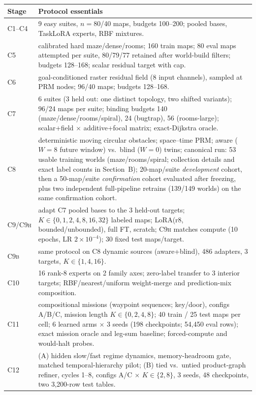 \documentclass[letterpaper]{article} %
\newcommand{\stage}[1]{\textsc{#1}}
\begin{document}
\begin{table}[t]
\centering
\small
\begin{tabular}{@{}lp{14.2cm}@{}}
\toprule
Stage & Protocol essentials \\
\midrule
\stage{C1--C4} & 9 easy suites, $n{=}80$/40 maps, budgets 100--200; pooled bases, TaskLoRA experts, RBF mixtures. \\
\stage{C5} & calibrated hard maze/dense/rooms; 160 train maps; 80 eval maps attempted per suite, 80/79/77 retained after world-build filters; budgets 128--168; scalar residual target with cap. \\
\stage{C6} & goal-conditioned raster residual field (8 input channels), sampled at PRM nodes; 96/40 maps; budgets 128--168. \\
\stage{C7} & 6 suites (3 held out: one distinct topology, two shifted variants); 96/24 maps per suite; binding budgets 140 (maze/dense/rooms/spiral), 24 (bugtrap), 56 (rooms-large); scalar+field $\times$ additive+focal matrix; exact-Dijkstra oracle. \\
\stage{C8} & deterministic moving circular obstacles; space--time PRM; aware ($W{=}8$ future window) vs.\ blind ($W{=}0$) twins; canonical run: 53 usable training worlds (maze/rooms/spiral; collection details and exact label counts in Section~B); 20-map/suite \emph{development} cohort, then a 50-map/suite \emph{confirmation} cohort evaluated after freezing, plus two independent full-pipeline retrains (139/149 worlds) on the same confirmation cohort. \\
\stage{C9/C9h} & adapt \stage{C7} pooled bases to the 3 held-out targets; $K \in \{0, 1, 2, 4, 8, 16, 32\}$ labeled maps; LoRA(r8, bounded/unbounded), full FT, scratch; \stage{C9h} matches compute (10 epochs, LR $2{\times}10^{-4}$); 30 fixed test maps/target. \\
\stage{C9b} & same protocol on \stage{C8} dynamic sources (aware+blind), 486 adapters, 3 targets, $K\in\{1,4,16\}$. \\
\stage{C10} & 16 rank-8 experts on 2 family axes; zero-label transfer to 3 interior targets; RBF/nearest/uniform weight-merge and prediction-mix composition. \\
\stage{C11} & compositional missions (waypoint sequences; key/door), configs A/B/C, mission length $K\in\{0,2,4,8\}$; 40 train / 25 test maps per cell; 6 learned arms $\times$ 3 seeds (198 checkpoints; 54{,}450 eval rows); exact mission oracle and leg-sum baseline; forced-compute and would-halt probes. \\
\stage{C12} & (A) hidden slow/fast regime dynamics, memory-headroom gate, matched temporal-hierarchy pilot; (B) tied vs.\ untied product-graph refiner, cycles 1--8, configs A/C $\times$ $K\in\{2,8\}$, 3 seeds, 48 checkpoints, two 3{,}200-row test tables. \\

\end{tabular}
\end{table}
\end{document}
